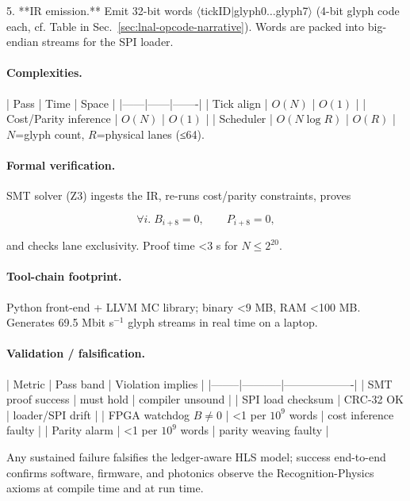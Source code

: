 \documentclass[11pt,oneside]{book}
\begin{document}
5. **IR emission.**  
   Emit 32-bit words  
   \(\langle\)tickID\(|\)glyph0\(\dots\)glyph7\(\rangle\)  
   (4-bit glyph code each, cf. Table in
   Sec.~\ref{sec:lnal-opcode-narrative}).  
   Words are packed into big-endian streams for the SPI loader.

\paragraph{Complexities.}

| Pass | Time | Space |
|------|------|-------|
| Tick align | \(O(N)\) | \(O(1)\) |
| Cost/Parity inference | \(O(N)\) | \(O(1)\) |
| Scheduler | \(O(N\log R)\) | \(O(R)\) |
\(N\)=glyph count, \(R\)=physical lanes (≤64).

\paragraph{Formal verification.}

SMT solver (Z3) ingests the IR, re-runs cost/parity constraints, proves  

\[
\forall i.\;
B_{i+8}=0,\qquad
P_{i+8}=0,
\]

and checks lane exclusivity.  Proof time <3 s for
\(N\le2^{20}\).

\paragraph{Tool-chain footprint.}

Python front-end + LLVM MC library; binary <9 MB,
RAM <100 MB.  Generates 69.5 Mbit s\(^{-1}\) glyph streams in real time
on a laptop.

\paragraph{Validation / falsification.}

| Metric | Pass band | Violation implies |
|--------|-----------|-------------------|
| SMT proof success | must hold | compiler unsound |
| SPI load checksum | CRC-32 OK | loader/SPI drift |
| FPGA watchdog \(B\neq0\) | <1 per \(10^{9}\) words | cost inference faulty |
| Parity alarm | <1 per \(10^{9}\) words | parity weaving faulty |

Any sustained failure falsifies the ledger-aware HLS model; success
end-to-end confirms software, firmware, and photonics observe the
Recognition-Physics axioms at compile time and at run time.

\end{document}
